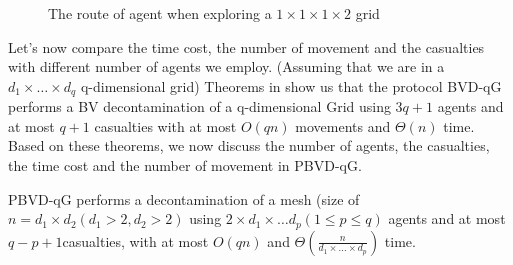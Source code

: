 \begin{figure} [H]
  \centering 
    \hspace{1in} 
    \caption{The route of agent when exploring a $1\times1\times1\times2$ grid } 
  \label{fig:grouproute} %
\end{figure}

Let's now compare the time cost, the number of movement and the casualties with different number of agents we employ. (Assuming that we are in a $d_1\times \ldots \times d_q$ q-dimensional grid)
Theorems in \cite{Cai} show us that the protocol BVD-qG performs a BV decontamination of a q-dimensional Grid using $3q+1$ agents and at most $q+1$ casualties with at most $O(qn)$ movements and $\Theta(n)$ time. Based on these theorems, we now discuss the number of agents, the casualties, the time cost and the number of movement in PBVD-qG.

\begin{theorem}
PBVD-qG performs a decontamination of a mesh (size of $n=d_1\times d_2(d_1>2,d_2>2)$ using $2\times d_1\times \ldots d_p (1\leq p\leq q)$ agents and at most $q-p+1$casualties, with at most $O(qn)$ and $\Theta(\frac{n}{d_1\times\ldots\times d_p})$ time.
\end{theorem}

